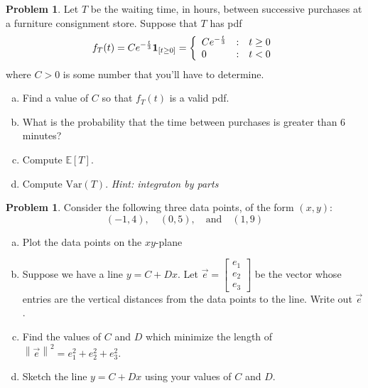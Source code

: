\documentclass[10pt]{article}
\theoremstyle{definition}
\newtheorem{problem}[theorem]{Problem}
\newcommand{\norm}[1]{\left\lVert#1\right\rVert} %
\newcommand{\1}[1]{\textbf{1}_{\left[#1\right]}} %
\def\E{\mathbb{E}} %
\def\Var{\mathrm{Var}} %
\begin{document}
\newpage


\begin{problem}%
  Let $T$ be the waiting time, in hours, between successive purchases at a
  furniture consignment store. Suppose that $T$ has pdf
  \begin{equation*}
    f_{T}(t) 
    = C e^{-\frac{t}{3}}\mathbf{1}_{\left[ t \geq 0\right] } 
    = \left\{ 
      \begin{array}{l@{\quad:\quad}l} Ce^{-\frac{t}{3}} & t \geq 0\\ 0& t<0\end{array}\right.
  \end{equation*}
  where $C>0$ is some number that you'll have to determine.
  \begin{enumerate}[(a)]
    \item Find a value of $C$ so that $f_{T}(t)$ is a valid pdf.
    \item What is the probability that the time between purchases is greater than $6$ minutes?
    \item Compute $\E\left[T \right]$.
    \item Compute $\Var(T)$. \textit{Hint: integraton by parts}
  \end{enumerate}
\end{problem}




\begin{problem}%
  Consider the following three data points, of the form $(x,y)$:
  \begin{equation*}
    (-1,4), \quad (0,5), \quad \text{and} \quad (1,9)
  \end{equation*}
  \begin{enumerate}[(a)]
    \item Plot the data points on the $xy$-plane
    \item Suppose we have a line $y=C+Dx$. Let
    $\vec{e}= \begin{bmatrix} e_{1}\\e_{2}\\e_{3} \end{bmatrix}$ be the vector
    whose entries are the vertical distances from the data points to the line.
    Write out $\vec{e}$.
    \item Find the values of $C$ and $D$ which minimize the length of
    $\norm{\vec{e}}^{2}=e_{1}^{2}+e_{2}^{2}+e_{3}^{2}$.
    \item Sketch the line $y=C+Dx$ using your values of $C$ and $D$.
  \end{enumerate}
\end{problem}
\end{document}
